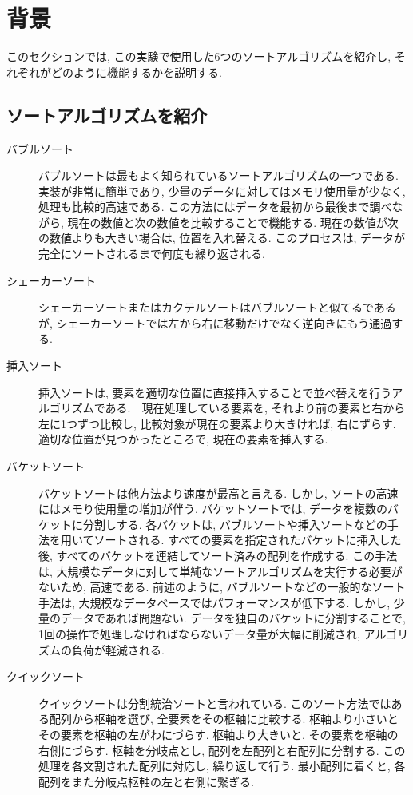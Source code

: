 \documentclass[a4j, 11pt]{jarticle}
\begin{document}
\section{背景}
このセクションでは, この実験で使用した6つのソートアルゴリズムを紹介し, それぞれがどのように機能するかを説明する.
\subsection{ソートアルゴリズムを紹介}
\begin{description}
  \item[バブルソート] バブルソートは最もよく知られているソートアルゴリズムの一つである. 実装が非常に簡単であり, 少量のデータに対してはメモリ使用量が少なく, 処理も比較的高速である. この方法にはデータを最初から最後まで調べながら, 現在の数値と次の数値を比較することで機能する. 現在の数値が次の数値よりも大きい場合は, 位置を入れ替える. このプロセスは, データが完全にソートされるまで何度も繰り返される.\\
  \item[シェーカーソート] シェーカーソートまたはカクテルソートはバブルソートと似てるであるが, シェーカーソートでは左から右に移動だけでなく逆向きにもう通過する. \\
  \item[挿入ソート] 挿入ソートは, 要素を適切な位置に直接挿入することで並べ替えを行うアルゴリズムである.　現在処理している要素を, それより前の要素と右から左に1つずつ比較し, 比較対象が現在の要素より大きければ, 右にずらす.　適切な位置が見つかったところで, 現在の要素を挿入する. \\
  \item[バケットソート] バケットソートは他方法より速度が最高と言える. しかし, ソートの高速にはメモり使用量の増加が伴う. バケットソートでは, データを複数のバケットに分割しする. 各バケットは, バブルソートや挿入ソートなどの手法を用いてソートされる. すべての要素を指定されたバケットに挿入した後, すべてのバケットを連結してソート済みの配列を作成する. この手法は, 大規模なデータに対して単純なソートアルゴリズムを実行する必要がないため, 高速である. 前述のように, バブルソートなどの一般的なソート手法は, 大規模なデータベースではパフォーマンスが低下する. しかし, 少量のデータであれば問題ない. データを独自のバケットに分割することで, 1回の操作で処理しなければならないデータ量が大幅に削減され, アルゴリズムの負荷が軽減される. \\
  \item[クイックソート] クイックソートは分割統治ソートと言われている. このソート方法ではある配列から枢軸を選び, 全要素をその枢軸に比較する. 枢軸より小さいとその要素を枢軸の左がわにづらす. 枢軸より大きいと, その要素を枢軸の右側にづらす. 枢軸を分岐点とし, 配列を左配列と右配列に分割する. この処理を各文割された配列に対応し, 繰り返して行う. 最小配列に着くと, 各配列をまた分岐点枢軸の左と右側に繋ぎる. \\

\end{description}
\end{document}
